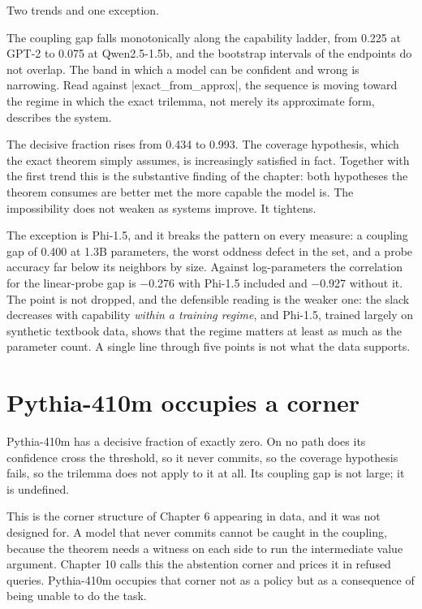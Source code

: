 \documentclass{memoir}
\begin{document}
Two trends and one exception.

The coupling gap falls monotonically along the capability ladder, from 0.225 at
GPT-2 to 0.075 at Qwen2.5-1.5b, and the bootstrap intervals of the endpoints do
not overlap. The band in which a model can be confident and wrong is narrowing.
Read against \LeanVerb|exact_from_approx|, the sequence is moving toward the regime in
which the exact trilemma, not merely its approximate form, describes the system.

The decisive fraction rises from 0.434 to 0.993. The coverage hypothesis, which
the exact theorem simply assumes, is increasingly satisfied in fact. Together
with the first trend this is the substantive finding of the chapter: both
hypotheses the theorem consumes are better met the more capable the model is.
The impossibility does not weaken as systems improve. It tightens.

The exception is Phi-1.5, and it breaks the pattern on every measure: a coupling
gap of 0.400 at 1.3B parameters, the worst oddness defect in the set, and a
probe accuracy far below its neighbors by size. Against log-parameters the
correlation for the linear-probe gap is −0.276 with Phi-1.5 included and −0.927
without it. The point is not dropped, and the defensible reading is the weaker
one: the slack decreases with capability \emph{within a training regime}, and
Phi-1.5, trained largely on synthetic textbook data, shows that the regime
matters at least as much as the parameter count. A single line through five
points is not what the data supports.



\section{Pythia-410m occupies a corner}\label{Two--Schemas--of--Impossibility-005F-005F-005F--Machine--Checked--Limits--of--Trustworthy--Machine--Learning-005F-005F-005F--and--Why--They--Tighten--with--Capability----Does--the--Constraint--Bind-005F-005F-005F--Measurements--on--Five--Models----Pythia--410m--occupies--a--corner}

Pythia-410m has a decisive fraction of exactly zero. On no path does its
confidence cross the threshold, so it never commits, so the coverage hypothesis
fails, so the trilemma does not apply to it at all. Its coupling gap is not
large; it is undefined.

This is the corner structure of Chapter 6 appearing in data, and it was not
designed for. A model that never commits cannot be caught in the coupling,
because the theorem needs a witness on each side to run the intermediate value
argument. Chapter 10 calls this the abstention corner and prices it in refused
queries. Pythia-410m occupies that corner not as a policy but as a consequence
of being unable to do the task.
\end{document}
